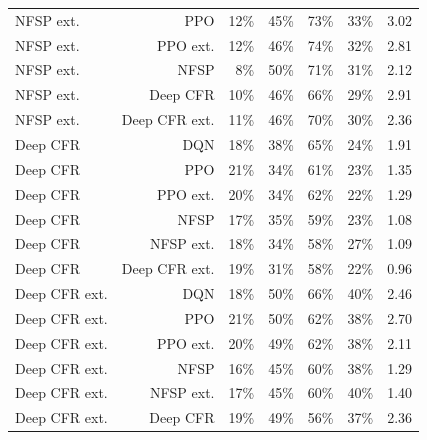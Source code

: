 \begin{tabular}{lrrrrrr}
NFSP ext. & PPO & 12\% & 45\% & 73\% & 33\% & 3.02 \\
NFSP ext. & PPO ext. & 12\% & 46\% & 74\% & 32\% & 2.81 \\
NFSP ext. & NFSP & 8\% & 50\% & 71\% & 31\% & 2.12 \\
NFSP ext. & Deep CFR & 10\% & 46\% & 66\% & 29\% & 2.91 \\
NFSP ext. & Deep CFR ext. & 11\% & 46\% & 70\% & 30\% & 2.36 \\
Deep CFR & DQN & 18\% & 38\% & 65\% & 24\% & 1.91 \\
Deep CFR & PPO & 21\% & 34\% & 61\% & 23\% & 1.35 \\
Deep CFR & PPO ext. & 20\% & 34\% & 62\% & 22\% & 1.29 \\
Deep CFR & NFSP & 17\% & 35\% & 59\% & 23\% & 1.08 \\
Deep CFR & NFSP ext. & 18\% & 34\% & 58\% & 27\% & 1.09 \\
Deep CFR & Deep CFR ext. & 19\% & 31\% & 58\% & 22\% & 0.96 \\
Deep CFR ext. & DQN & 18\% & 50\% & 66\% & 40\% & 2.46 \\
Deep CFR ext. & PPO & 21\% & 50\% & 62\% & 38\% & 2.70 \\
Deep CFR ext. & PPO ext. & 20\% & 49\% & 62\% & 38\% & 2.11 \\
Deep CFR ext. & NFSP & 16\% & 45\% & 60\% & 38\% & 1.29 \\
Deep CFR ext. & NFSP ext. & 17\% & 45\% & 60\% & 40\% & 1.40 \\
Deep CFR ext. & Deep CFR & 19\% & 49\% & 56\% & 37\% & 2.36 \\
\bottomrule
\end{tabular}
